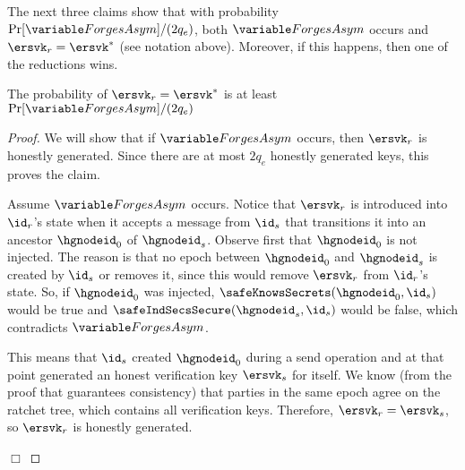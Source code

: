 The next three claims show that with probability $\Pr[\forgesa]/(2q_e)$, both $\forgesa$ occurs and \mbox{$\ersvk_r=\ersvk^*$} (see notation above). Moreover, if this happens, then one of the reductions wins.

\begin{claim}
  The probability of $\ersvk_r=\ersvk^*$ is at least $\Pr[\forgesa]/(2q_e)$
\end{claim}
\begin{proof}
  We will show that if $\forgesa$ occurs, then $\ersvk_r$ is honestly generated. Since there are at most $2q_e$ honestly generated keys, this proves the claim.

  Assume $\forgesa$ occurs.
  Notice that $\ersvk_r$ is introduced into $\id_r$'s state when it accepts a message from $\id_s$ that transitions it into an ancestor $\hgnodeid_0$ of $\hgnodeid_s$.
  Observe first that $\hgnodeid_0$ is not injected. The reason is that no epoch between $\hgnodeid_0$ and $\hgnodeid_s$ is created by $\id_s$ or removes it, since this would remove $\ersvk_r$ from $\id_r$'s state. So, if $\hgnodeid_0$ was injected, $\safeKnowsSecrets(\hgnodeid_0, \id_s)$ would be true and $\safeIndSecsSecure(\hgnodeid_s, \id_s)$ would be false, which contradicts $\forgesa$.

  This means that $\id_s$ created $\hgnodeid_0$ during a send operation and at that point generated an honest verification key $\ersvk_s$ for itself. We know (from the proof that \saik guarantees consistency) that parties in the same epoch agree on the ratchet tree, which contains all verification keys. Therefore, $\ersvk_r=\ersvk_s$, so $\ersvk_r$ is honestly generated.
\strut\hfill$\Box$\end{proof}

